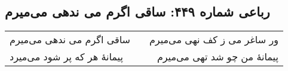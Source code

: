 \begin{center}
\section*{رباعی شماره ۴۴۹: ساقی اگرم می ندهی می‌میرم}
\label{sec:sh449}
\begin{longtable}{l p{0.5cm} r}
ساقی اگرم می ندهی می‌میرم
&&
ور ساغر می ز کف نهی می‌میرم
\\
پیمانهٔ هر که پر شود می‌میرد
&&
پیمانهٔ من چو شد تهی می‌میرم
\\
\end{longtable}
\end{center}
